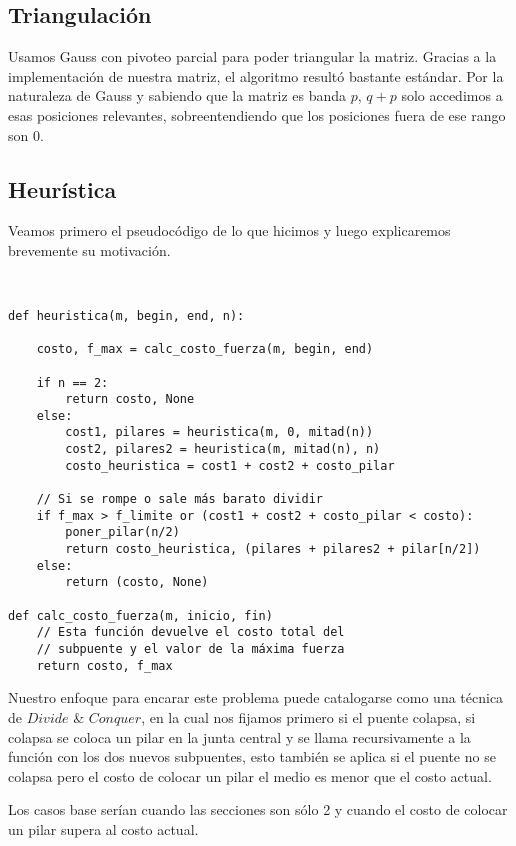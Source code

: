 \subsection{Triangulación}

Usamos Gauss con pivoteo parcial para poder triangular la matriz. Gracias a la implementación de nuestra matriz, el algoritmo resultó bastante estándar. Por la naturaleza de Gauss y sabiendo que la matriz es banda $p$, $q + p$ solo accedimos a esas posiciones relevantes, sobreentendiendo que los posiciones fuera de ese rango son $0$.

\subsection{Heurística}

Veamos primero el pseudocódigo de lo que hicimos y luego explicaremos brevemente su motivación.

\begin{verbatim}


def heuristica(m, begin, end, n):

    costo, f_max = calc_costo_fuerza(m, begin, end)

    if n == 2:
        return costo, None
    else:
        cost1, pilares = heuristica(m, 0, mitad(n))
        cost2, pilares2 = heuristica(m, mitad(n), n)
        costo_heuristica = cost1 + cost2 + costo_pilar

    // Si se rompe o sale más barato dividir
    if f_max > f_limite or (cost1 + cost2 + costo_pilar < costo):
        poner_pilar(n/2)
        return costo_heuristica, (pilares + pilares2 + pilar[n/2])
    else:
        return (costo, None)
                        
def calc_costo_fuerza(m, inicio, fin)
    // Esta función devuelve el costo total del
    // subpuente y el valor de la máxima fuerza
    return costo, f_max
\end{verbatim}

Nuestro enfoque para encarar este problema puede catalogarse como una técnica de $Divide$ & $Conquer$, en la cual nos fijamos primero si el puente colapsa, si colapsa se coloca un pilar en la junta central y se llama recursivamente a la función con los dos nuevos subpuentes, esto también se aplica si el puente no se colapsa pero el costo de colocar un pilar el medio es menor que el costo actual.

Los casos base serían cuando las secciones son sólo 2 y cuando el costo de colocar un pilar supera al costo actual.

